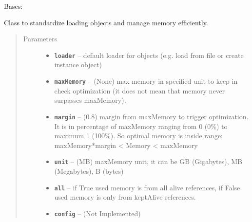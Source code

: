 \documentclass[letterpaper,10pt,english]{sphinxmanual}
\begin{document}

\begin{fulllineitems}
\label{RRtoolbox.lib:RRtoolbox.lib.image.LoaderDict}
Bases: {\hyperref[RRtoolbox.lib:RRtoolbox.lib.cache.ResourceManager]{\emph{}}}

Class to standardize loading objects and manage memory efficiently.
\begin{quote}\begin{description}
\item[{Parameters}] \leavevmode\begin{itemize}
\item {} 
\textbf{\texttt{loader}} -- default loader for objects (e.g. load from file or create instance object)

\item {} 
\textbf{\texttt{maxMemory}} -- (None) max memory in specified unit to keep in check optimization (it does
not mean that memory never surpasses maxMemory).

\item {} 
\textbf{\texttt{margin}} -- (0.8) margin from maxMemory to trigger optimization.
It is in percentage of maxMemory ranging from 0 (0\%) to maximum 1 (100\%).
So optimal memory is inside range: maxMemory*margin \textless{} Memory \textless{} maxMemory

\item {} 
\textbf{\texttt{unit}} -- (MB) maxMemory unit, it can be GB (Gigabytes), MB (Megabytes), B (bytes)

\item {} 
\textbf{\texttt{all}} -- if True used memory is from all alive references,
if False used memory is only from keptAlive references.

\item {} 
\textbf{\texttt{config}} -- (Not Implemented)

\end{itemize}

\end{description}\end{quote}

\begin{fulllineitems}
\label{RRtoolbox.lib:RRtoolbox.lib.image.LoaderDict.register}
\end{fulllineitems}


\end{fulllineitems}
\end{document}
